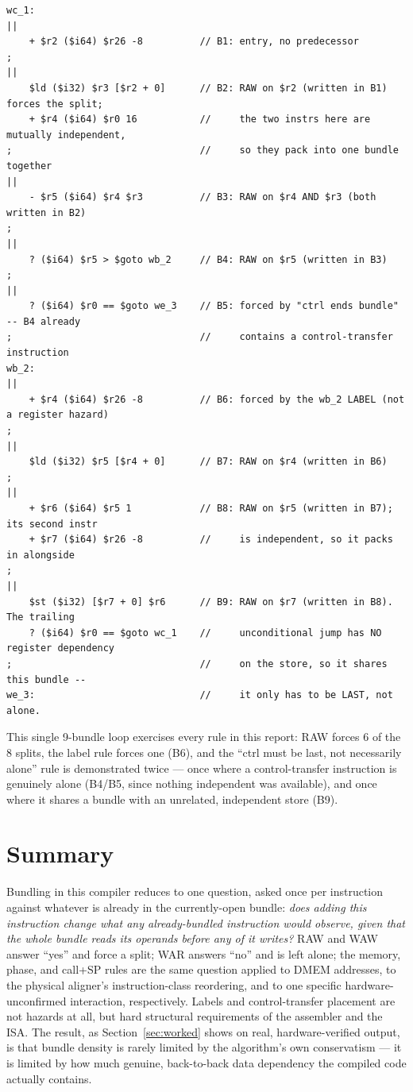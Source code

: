 \documentclass[11pt,a4paper]{article}
\begin{document}
\begin{lstlisting}[caption={Bundled mcode, with the hazard forcing each split}]
wc_1:
||
    + $r2 ($i64) $r26 -8          // B1: entry, no predecessor
;
||
    $ld ($i32) $r3 [$r2 + 0]      // B2: RAW on $r2 (written in B1) forces the split;
    + $r4 ($i64) $r0 16           //     the two instrs here are mutually independent,
;                                 //     so they pack into one bundle together
||
    - $r5 ($i64) $r4 $r3          // B3: RAW on $r4 AND $r3 (both written in B2)
;
||
    ? ($i64) $r5 > $goto wb_2     // B4: RAW on $r5 (written in B3)
;
||
    ? ($i64) $r0 == $goto we_3    // B5: forced by "ctrl ends bundle" -- B4 already
;                                 //     contains a control-transfer instruction
wb_2:
||
    + $r4 ($i64) $r26 -8          // B6: forced by the wb_2 LABEL (not a register hazard)
;
||
    $ld ($i32) $r5 [$r4 + 0]      // B7: RAW on $r4 (written in B6)
;
||
    + $r6 ($i64) $r5 1            // B8: RAW on $r5 (written in B7); its second instr
    + $r7 ($i64) $r26 -8          //     is independent, so it packs in alongside
;
||
    $st ($i32) [$r7 + 0] $r6      // B9: RAW on $r7 (written in B8). The trailing
    ? ($i64) $r0 == $goto wc_1    //     unconditional jump has NO register dependency
;                                 //     on the store, so it shares this bundle --
we_3:                             //     it only has to be LAST, not alone.
\end{lstlisting}

This single 9-bundle loop exercises every rule in this report: RAW forces 6 of the 8
splits, the label rule forces one (B6), and the ``ctrl must be last, not necessarily
alone'' rule is demonstrated twice --- once where a control-transfer instruction is
genuinely alone (B4/B5, since nothing independent was available), and once where it
shares a bundle with an unrelated, independent store (B9).

\section{Summary}

Bundling in this compiler reduces to one question, asked once per instruction against
whatever is already in the currently-open bundle: \emph{does adding this instruction
change what any already-bundled instruction would observe, given that the whole bundle
reads its operands before any of it writes?} RAW and WAW answer ``yes'' and force a
split; WAR answers ``no'' and is left alone; the memory, phase, and call+SP rules are the
same question applied to DMEM addresses, to the physical aligner's instruction-class
reordering, and to one specific hardware-unconfirmed interaction, respectively. Labels and
control-transfer placement are not hazards at all, but hard structural requirements of the
assembler and the ISA. The result, as Section~\ref{sec:worked} shows on real,
hardware-verified output, is that bundle density is rarely limited by the algorithm's own
conservatism --- it is limited by how much genuine, back-to-back data dependency the
compiled code actually contains.
\end{document}
